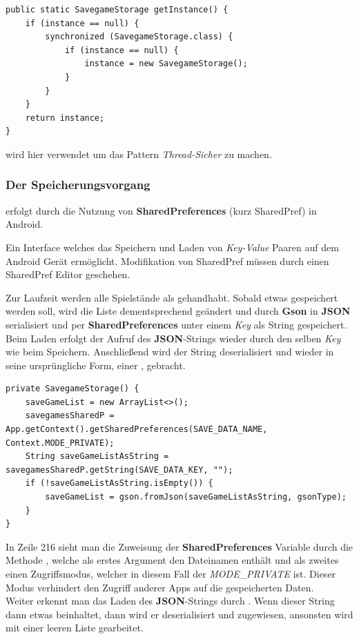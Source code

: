 \begin{lstlisting}[caption={SavegameStorage Singleton},captionpos=b]
public static SavegameStorage getInstance() {
	if (instance == null) {
		synchronized (SavegameStorage.class) {
			if (instance == null) {
				instance = new SavegameStorage();
			}
		}
	}
	return instance;
}
\end{lstlisting}

 wird hier verwendet um das Pattern \emph{Thread-Sicher} zu
machen.

\subsubsection{Der Speicherungsvorgang}

erfolgt durch die Nutzung von \textbf{SharedPreferences} (kurz SharedPref) in
Android.

\begin{infobox}[frametitle=SharedPreferences]
Ein Interface welches das Speichern und Laden von \emph{Key-Value} Paaren auf
dem Android Gerät ermöglicht. Modifikation von SharedPref müssen durch einen
SharedPref Editor geschehen.
\end{infobox}
Zur Laufzeit werden alle Spielstände als  gehandhabt.
Sobald etwas gespeichert werden soll, wird die Liste dementsprechend geändert und
durch \textbf{Gson} in \textbf{JSON} serialisiert und per
\textbf{SharedPreferences} unter einem \emph{Key} als String gespeichert. Beim
Laden erfolgt der Aufruf des \textbf{JSON}-Strings wieder durch den selben
\emph{Key} wie beim Speichern. Anschließend wird der String deserialisiert und
wieder in seine ursprüngliche Form, einer , gebracht.

\begin{lstlisting}[caption={SavegameStorage Konstruktor},captionpos=b]
private SavegameStorage() {
	saveGameList = new ArrayList<>();
	savegamesSharedP = App.getContext().getSharedPreferences(SAVE_DATA_NAME, Context.MODE_PRIVATE);
	String saveGameListAsString = savegamesSharedP.getString(SAVE_DATA_KEY, "");
	if (!saveGameListAsString.isEmpty()) {
		saveGameList = gson.fromJson(saveGameListAsString, gsonType);
	}
}
\end{lstlisting}

In Zeile 216 sieht man die Zuweisung der \textbf{SharedPreferences} Variable
durch die Methode , welche als erstes
Argument den Dateinamen enthält und als zweites einen Zugriffsmodus, welcher in
diesem Fall der \emph{MODE\_PRIVATE} ist. Dieser Modus verhindert den Zugriff
anderer Apps auf die gespeicherten Daten.\\ Weiter erkennt man das Laden des
\textbf{JSON}-Strings durch .
Wenn dieser String dann etwas beinhaltet, dann wird er deserialisiert und
zugewiesen, ansonsten wird mit einer leeren Liste gearbeitet.

